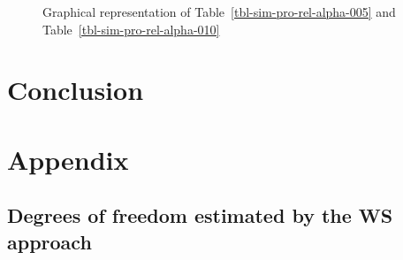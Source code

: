 \documentclass[
  12pt]{article}
\begin{document}
\endgroup{}

\begin{figure}[h]


\caption{\label{fig-sim-pro-rel-alpha}Graphical representation of
Table~\ref{tbl-sim-pro-rel-alpha-005} and
Table~\ref{tbl-sim-pro-rel-alpha-010}}

\end{figure}%

\section{Conclusion}\label{sec-conc}

\section{Appendix}\label{appendix}

\subsection{Degrees of freedom estimated by the WS
approach}\label{sec-df-ws}
\end{document}
